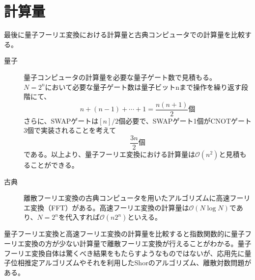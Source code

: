 \documentclass[dvipdfmx]{jsarticle}
\begin{document}
\section{計算量}
最後に量子フーリエ変換における計算量と古典コンピュータでの計算量を比較する。
\begin{description}
    \item[量子]量子コンピュータの計算量を必要な量子ゲート数で見積もる。\\
    $N=2^n$において必要な量子ゲート数は量子ビットnまで操作を繰り返す段階にて、
    \[
        n+(n-1)+\cdots+1 = \frac{n(n+1)}{2}\text{個}
    \]
    さらに、SWAPゲートは$[n]/2$個必要で、SWAPゲート1個がCNOTゲート3個で実装されることを考えて
    \[  
        \frac{3n}{2}\text{個}
    \]
    である。以上より、量子フーリエ変換における計算量は$\mathcal{O}(n^2)$と見積もることができる。
    \item[古典]
    離散フーリエ変換の古典コンピュータを用いたアルゴリズムに高速フーリエ変換（FFT）がある。高速フーリエ変換の計算量は$\mathcal{O}(N\log N)$であり、$N=2^n$を代入すれば$\mathcal{O}(n 2^n)$といえる。
\end{description}
量子フーリエ変換と高速フーリエ変換の計算量を比較すると指数関数的に量子フーリエ変換の方が少ない計算量で離散フーリエ変換が行えることがわかる。量子フーリエ変換自体は驚くべき結果をもたらすようなものではないが、応用先に量子位相推定アルゴリズムやそれを利用したShorのアルゴリズム、離散対数問題がある。
\end{document}
